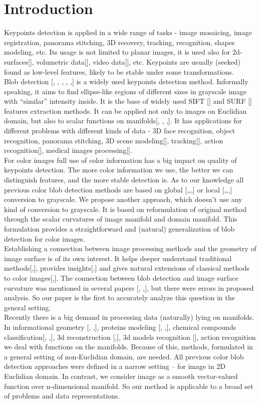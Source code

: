 \documentclass{llncs}
\begin{document}
\section{Introduction}
%
Keypoints detection is applied in a wide range of tasks - image mosaicing, image registration, panorama stitching, 3D recovery, tracking, recognition, shapes modeling, etc. Its usage is not limited to planar images, it is used also for 2d-surfaces[], volumetric data[], video data[], etc. Keypoints are usually (seeked) found as low-level features, likely to be stable under some transformations. 
\\
Blob detection [, , , , ,] is a widely used keypoints detection method. Informally speaking, it aims to find ellipse-like regions of different sizes in grayscale image with “similar” intensity inside. It is the base of widely used SIFT [] and SURF [] features extraction methods. It can be applied not only to images on Euclidian domain, but also to scalar functions on manifolds[, , ,]. It has applications for different problems with different kinds of data - 3D face recognition, object recognition, panorama stitching, 3D scene modeling[], tracking[], action recognition[], medical images processing[].
\\
For color images full use of color information has a big impact on quality of keypoints detection. The more color information we use, the better we can distinguish features, and the more stable detection is. As to our knowledge all previous color blob detection methods are based on global [,,,] or local [,,,] conversion to grayscale. We propose another approach, which doesn’t use any kind of conversion to grayscale. It is based on reformulation of original method through the scalar curvatures of image manifold and domain manifold. This formulation provides a straightforward and (natural) generalization of blob detection for color images.
\\
Establishing a connection between image processing methods and the geometry of image surface is of its own interest. It helps deeper understand traditional methods[,], provides insights[,] and gives natural extensions of classical methods to color images[,]. The connection between blob detection and image surface curvature was mentioned in several papers [, ,], but there were errors in proposed analysis. So our paper is the first to accurately analyze this question in the general setting.
\\
Recently there is a big demand in processing data (naturally) lying on manifolds. In informational geometry [, ,], proteins modeling [, ,], chemical compounds classification[, ,], 3d reconstruction [,], 3d models recognition [], action recognition we deal with functions on the manifolds. Because of this, methods, formulated in a general setting of non-Euclidian domain, are needed. All previous color blob detection approaches were defined in a narrow setting – for image in 2D Euclidian domain. In contrast, we consider image as a smooth vector-valued function over n-dimensional manifold. So our method is applicable to a broad set of problems and data representations. 
\end{document}
